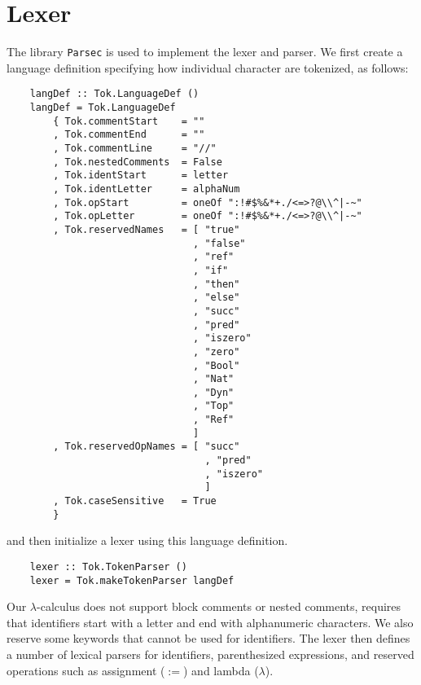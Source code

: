 \section{Lexer}
The library \texttt{Parsec} is used to implement the lexer and parser. 
We first create a language definition specifying how individual character are tokenized, as follows:
\begin{lstlisting}
    langDef :: Tok.LanguageDef ()
    langDef = Tok.LanguageDef
        { Tok.commentStart    = ""  
        , Tok.commentEnd      = ""
        , Tok.commentLine     = "//"
        , Tok.nestedComments  = False
        , Tok.identStart      = letter 
        , Tok.identLetter     = alphaNum 
        , Tok.opStart         = oneOf ":!#$%&*+./<=>?@\\^|-~"
        , Tok.opLetter        = oneOf ":!#$%&*+./<=>?@\\^|-~"
        , Tok.reservedNames   = [ "true"
                                , "false"
                                , "ref"
                                , "if"
                                , "then"
                                , "else"
                                , "succ"
                                , "pred"
                                , "iszero"
                                , "zero"
                                , "Bool"
                                , "Nat"
                                , "Dyn"
                                , "Top"
                                , "Ref" 
                                ]
        , Tok.reservedOpNames = [ "succ"
                                  , "pred"
                                  , "iszero" 
                                  ]
        , Tok.caseSensitive   = True
        }
\end{lstlisting}
and then initialize a lexer using this language definition.
\begin{lstlisting}
    lexer :: Tok.TokenParser ()
    lexer = Tok.makeTokenParser langDef
\end{lstlisting}

Our $\lambda$-calculus does not support block comments or nested comments, requires that identifiers start with a 
letter and end with alphanumeric characters. We also reserve some keywords that cannot be used for identifiers. 
The lexer then defines a number of lexical parsers for identifiers, parenthesized expressions, 
and reserved operations such as assignment ($:=$) and lambda ($\lambda$). 

